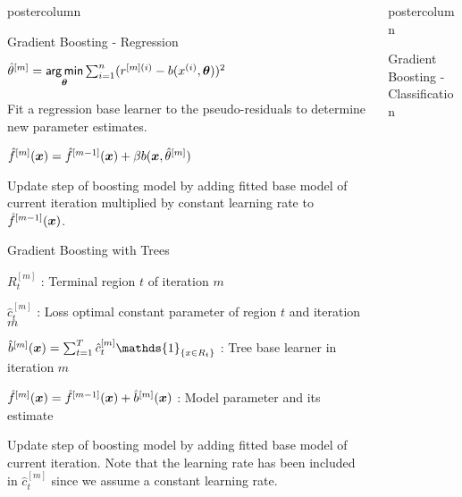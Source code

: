 \documentclass{beamer}
\newlength{\columnheight} %
\begin{document}
\begin{frame}[fragile]{}
\begin{columns}
\begin{column}{.31\textwidth}
\begin{beamercolorbox}[center]{postercolumn}
\begin{minipage}{.98\textwidth}
{\begin{myblock}{Gradient Boosting - Regression}
\begin{codebox}
							 $\hat{\theta}^{[m]} = \mathop{\sf arg\,min} \limits_{\bm{\theta}} \sum_{i=1}^n (r^{[m](i)} - b(x^{(i)}, \bm{\theta}))^2$
						\end{codebox}
						\hspace*{1ex} Fit a regression base learner to the pseudo-residuals to determine new parameter estimates.\\
						\begin{codebox}
							 $\hat{f}^{[m]}(\bm{x}) = \hat{f}^{[m-1]}(\bm{x}) + \beta b(\bm{x}, \hat{\theta}^{[m]})$
						\end{codebox}
						\hspace*{1ex} Update step of boosting model by adding fitted base model of current iteration multiplied by constant learning rate to $\hat{f}^{[m-1]}(\bm{x})$. \\
						\end{myblock}
					\begin{myblock}{Gradient Boosting with Trees}
						\begin{codebox}
							$R_t^{[m]}$ : Terminal region $t$ of iteration $m$
						\end{codebox}
						\hspace*{1ex}
						\begin{codebox}
							 $\hat{c}_t^{[m]}$ : Loss optimal constant parameter of region $t$ and iteration $m$
						\end{codebox}
						\hspace*{1ex} 
						\begin{codebox}
							 $\bmmh(\xv) = \sum_{t=1}^{T} \ctmh \mathds{1}_{\{x \in R_t\}}$ : Tree base learner in iteration $m$
						\end{codebox}
						\hspace*{1ex}
						\begin{codebox}
							 $\hat{f}^{[m]}(\bm{x}) = \hat{f}^{[m-1]}(\bm{x}) + \hat{b}^{[m]}(\bm{x})$ : Model parameter and its estimate
						\end{codebox}
						\hspace*{1ex} Update step of boosting model by adding fitted base model of current iteration. Note that the learning rate has been included in $\hat{c}_t^{[m]}$ since we assume a constant learning rate. \\
					\end{myblock}					
				}
			\end{minipage}
		\end{beamercolorbox}
	\end{column}


	\begin{column}{.31\textwidth}
		\begin{beamercolorbox}[center]{postercolumn}
			\begin{minipage}{.98\textwidth}
				\parbox[t][\columnheight]{\textwidth}{
				\begin{myblock}{Gradient Boosting - Classification}
						

\end{myblock}}
\end{minipage}
\end{beamercolorbox}
\end{column}
\end{columns}
\end{frame}
\end{document}
